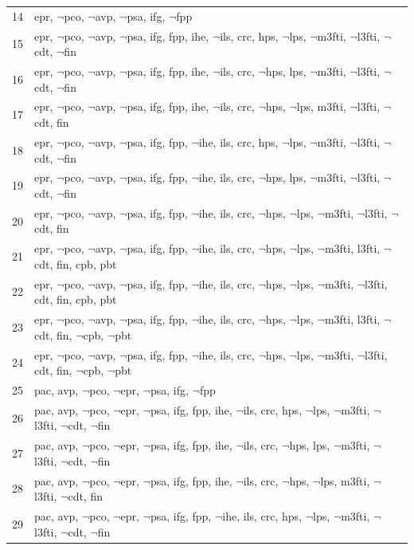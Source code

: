 \documentclass{IOS-Book-Article}
\begin{document}
\begin{longtable}{p{5mm}p{115mm}}
14	& epr, $\neg$pco, $\neg$avp, $\neg$psa, ifg, $\neg$fpp \\
15	& epr, $\neg$pco, $\neg$avp, $\neg$psa, ifg, fpp, ihe, $\neg$ils, crc, hps, $\neg$lps, $\neg$m3fti, $\neg$l3fti, $\neg$cdt, $\neg$fin \\
16	& epr, $\neg$pco, $\neg$avp, $\neg$psa, ifg, fpp, ihe, $\neg$ils, crc, $\neg$hps, lps, $\neg$m3fti, $\neg$l3fti, $\neg$cdt, $\neg$fin \\
17	& epr, $\neg$pco, $\neg$avp, $\neg$psa, ifg, fpp, ihe, $\neg$ils, crc, $\neg$hps, $\neg$lps, m3fti, $\neg$l3fti, $\neg$cdt, fin \\
18	& epr, $\neg$pco, $\neg$avp, $\neg$psa, ifg, fpp, $\neg$ihe, ils, crc, hps, $\neg$lps, $\neg$m3fti, $\neg$l3fti, $\neg$cdt, $\neg$fin \\
19	& epr, $\neg$pco, $\neg$avp, $\neg$psa, ifg, fpp, $\neg$ihe, ils, crc, $\neg$hps, lps, $\neg$m3fti, $\neg$l3fti, $\neg$cdt, $\neg$fin \\
20	& epr, $\neg$pco, $\neg$avp, $\neg$psa, ifg, fpp, $\neg$ihe, ils, crc, $\neg$hps, $\neg$lps, $\neg$m3fti, $\neg$l3fti, $\neg$cdt, fin \\
21	& epr, $\neg$pco, $\neg$avp, $\neg$psa, ifg, fpp, $\neg$ihe, ils, crc, $\neg$hps, $\neg$lps, $\neg$m3fti, l3fti, $\neg$cdt, fin, cpb, pbt \\
22	& epr, $\neg$pco, $\neg$avp, $\neg$psa, ifg, fpp, $\neg$ihe, ils, crc, $\neg$hps, $\neg$lps, $\neg$m3fti, $\neg$l3fti, cdt, fin, cpb, pbt \\
23	& epr, $\neg$pco, $\neg$avp, $\neg$psa, ifg, fpp, $\neg$ihe, ils, crc, $\neg$hps, $\neg$lps, $\neg$m3fti, l3fti, $\neg$cdt, fin, $\neg$cpb, $\neg$pbt \\
24	& epr, $\neg$pco, $\neg$avp, $\neg$psa, ifg, fpp, $\neg$ihe, ils, crc, $\neg$hps, $\neg$lps, $\neg$m3fti, $\neg$l3fti, cdt, fin, $\neg$cpb, $\neg$pbt \\
25	& pac, avp, $\neg$pco, $\neg$epr, $\neg$psa, ifg, $\neg$fpp \\
26	& pac, avp, $\neg$pco, $\neg$epr, $\neg$psa, ifg, fpp, ihe, $\neg$ils, crc, hps, $\neg$lps, $\neg$m3fti, $\neg$l3fti, $\neg$cdt, $\neg$fin \\
27	& pac, avp, $\neg$pco, $\neg$epr, $\neg$psa, ifg, fpp, ihe, $\neg$ils, crc, $\neg$hps, lps, $\neg$m3fti, $\neg$l3fti, $\neg$cdt, $\neg$fin \\
28	& pac, avp, $\neg$pco, $\neg$epr, $\neg$psa, ifg, fpp, ihe, $\neg$ils, crc, $\neg$hps, $\neg$lps, m3fti, $\neg$l3fti, $\neg$cdt, fin \\
29	& pac, avp, $\neg$pco, $\neg$epr, $\neg$psa, ifg, fpp, $\neg$ihe, ils, crc, hps, $\neg$lps, $\neg$m3fti, $\neg$l3fti, $\neg$cdt, $\neg$fin \\


\end{longtable}
\end{document}
